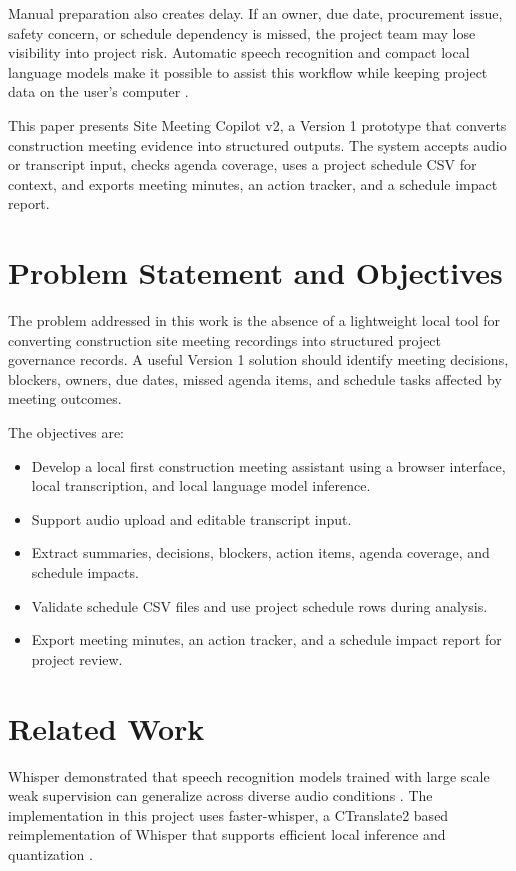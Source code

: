\documentclass[conference]{IEEEtran}
\begin{document}
Manual preparation also creates delay. If an owner, due date, procurement issue, safety concern, or schedule dependency is missed, the project team may lose visibility into project risk. Automatic speech recognition and compact local language models make it possible to assist this workflow while keeping project data on the user's computer \cite{radford2023whisper,abdin2024phi3}.

This paper presents Site Meeting Copilot v2, a Version 1 prototype that converts construction meeting evidence into structured outputs. The system accepts audio or transcript input, checks agenda coverage, uses a project schedule CSV for context, and exports meeting minutes, an action tracker, and a schedule impact report.

\section{Problem Statement and Objectives}
The problem addressed in this work is the absence of a lightweight local tool for converting construction site meeting recordings into structured project governance records. A useful Version 1 solution should identify meeting decisions, blockers, owners, due dates, missed agenda items, and schedule tasks affected by meeting outcomes.

The objectives are:
\begin{itemize}
    \item Develop a local first construction meeting assistant using a browser interface, local transcription, and local language model inference.
    \item Support audio upload and editable transcript input.
    \item Extract summaries, decisions, blockers, action items, agenda coverage, and schedule impacts.
    \item Validate schedule CSV files and use project schedule rows during analysis.
    \item Export meeting minutes, an action tracker, and a schedule impact report for project review.
\end{itemize}

\section{Related Work}
Whisper demonstrated that speech recognition models trained with large scale weak supervision can generalize across diverse audio conditions \cite{radford2023whisper}. The implementation in this project uses faster-whisper, a CTranslate2 based reimplementation of Whisper that supports efficient local inference and quantization \cite{fasterwhisper}.
\end{document}

